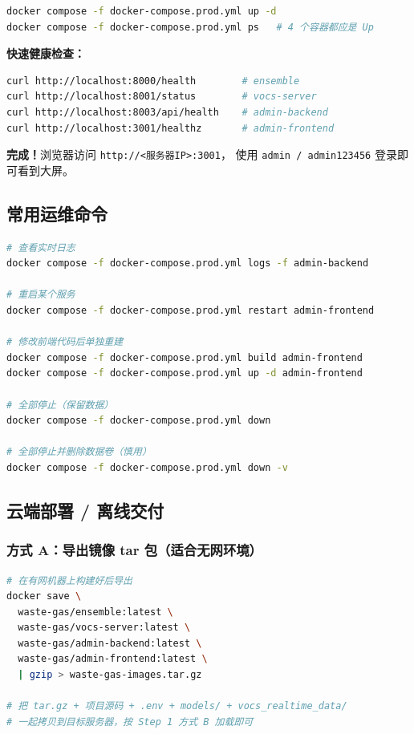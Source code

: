 \documentclass[UTF8,a4paper,11pt]{ctexart}
\begin{document}
\begin{stepbox}
\begin{lstlisting}[language=bash]
docker compose -f docker-compose.prod.yml up -d
docker compose -f docker-compose.prod.yml ps   # 4 个容器都应是 Up
\end{lstlisting}

\textbf{快速健康检查：}

\begin{lstlisting}[language=bash]
curl http://localhost:8000/health        # ensemble
curl http://localhost:8001/status        # vocs-server
curl http://localhost:8003/api/health    # admin-backend
curl http://localhost:3001/healthz       # admin-frontend
\end{lstlisting}

\textbf{完成！}浏览器访问 \texttt{http://<服务器IP>:3001}，
使用 \texttt{admin / admin123456} 登录即可看到大屏。
\end{stepbox}

\subsection{常用运维命令}

\begin{lstlisting}[language=bash]
# 查看实时日志
docker compose -f docker-compose.prod.yml logs -f admin-backend

# 重启某个服务
docker compose -f docker-compose.prod.yml restart admin-frontend

# 修改前端代码后单独重建
docker compose -f docker-compose.prod.yml build admin-frontend
docker compose -f docker-compose.prod.yml up -d admin-frontend

# 全部停止（保留数据）
docker compose -f docker-compose.prod.yml down

# 全部停止并删除数据卷（慎用）
docker compose -f docker-compose.prod.yml down -v
\end{lstlisting}

\subsection{云端部署 / 离线交付}

\subsubsection{方式 A：导出镜像 tar 包（适合无网环境）}

\begin{lstlisting}[language=bash]
# 在有网机器上构建好后导出
docker save \
  waste-gas/ensemble:latest \
  waste-gas/vocs-server:latest \
  waste-gas/admin-backend:latest \
  waste-gas/admin-frontend:latest \
  | gzip > waste-gas-images.tar.gz

# 把 tar.gz + 项目源码 + .env + models/ + vocs_realtime_data/
# 一起拷贝到目标服务器，按 Step 1 方式 B 加载即可
\end{lstlisting}
\end{document}
